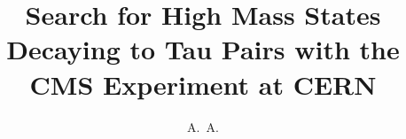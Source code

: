 \documentclass[defaultstyle,11pt]{thesis}
\title{Search for High Mass States Decaying to Tau Pairs with the CMS Experiment at CERN}
\author{A.~A.}{Johnson}
\begin{document}


















\nocite{*}		%
%

%
%
\end{document}
